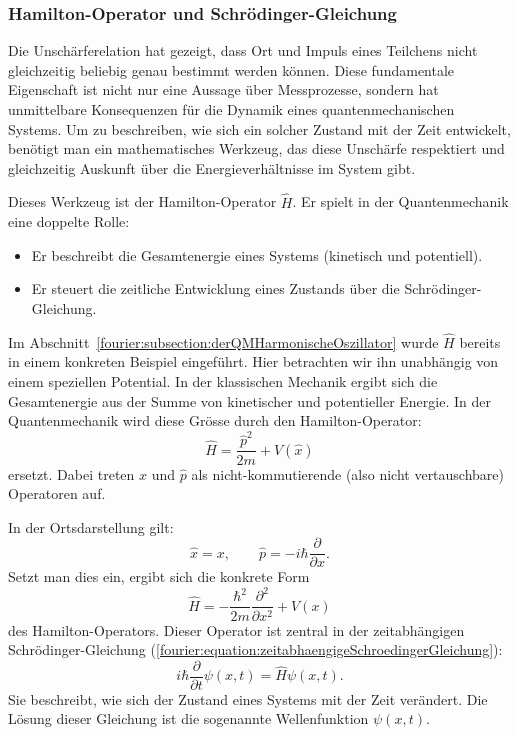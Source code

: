 \subsubsection{Hamilton-Operator und Schrödinger-Gleichung%
\label{fourier:subsubsection:hamiltonOperatorUndSchroedinger}}
Die Unschärferelation hat gezeigt, dass Ort und Impuls eines Teilchens nicht gleichzeitig beliebig genau bestimmt werden können.
Diese fundamentale Eigenschaft ist nicht nur eine Aussage über Messprozesse,
sondern hat unmittelbare Konsequenzen für die Dynamik eines quantenmechanischen Systems.
Um zu beschreiben, wie sich ein solcher Zustand mit der Zeit entwickelt,
benötigt man ein mathematisches Werkzeug, das diese Unschärfe respektiert
und gleichzeitig Auskunft über die Energieverhältnisse im System gibt.

Dieses Werkzeug ist der Hamilton-Operator \( \hat{H} \).
Er spielt in der Quantenmechanik eine doppelte Rolle:
\begin{itemize}
\item Er beschreibt die Gesamtenergie eines Systems (kinetisch und potentiell).
\item Er steuert die zeitliche Entwicklung eines Zustands über die Schrödinger-Gleichung.
\end{itemize}
Im Abschnitt~\ref{fourier:subsection:derQMHarmonischeOszillator} wurde $\hat{H}$ bereits in einem konkreten Beispiel eingeführt.
Hier betrachten wir ihn unabhängig von einem speziellen Potential.
In der klassischen Mechanik ergibt sich die Gesamtenergie aus der Summe von kinetischer und potentieller Energie.
In der Quantenmechanik wird diese Grösse durch den Hamilton-Operator:
\begin{equation}\label{fourier:equation:HamiltonOperatorQM}
	\hat{H} = \frac{\hat{p}^2}{2m} + V(\hat{x})
\end{equation}
ersetzt.
Dabei treten $\hat{x}$ und $\hat{p}$ als nicht-kommutierende (also nicht vertauschbare) Operatoren auf.

In der Ortsdarstellung gilt:
\begin{equation}
	\hat{x} = x, \qquad \hat{p} = -i\hbar \frac{\partial}{\partial x}.
\end{equation}
Setzt man dies ein, ergibt sich die konkrete Form
\begin{equation}
	\hat{H} = -\frac{\hbar^2}{2m} \frac{\partial^2}{\partial x^2} + V(x)
\end{equation}
des Hamilton-Operators.
Dieser Operator ist zentral in der zeitabhängigen Schrödinger-Gleichung (\ref{fourier:equation:zeitabhaengigeSchroedingerGleichung}):
\begin{equation}
	i\hbar \frac{\partial}{\partial t} \psi(x,t) = \hat{H} \psi(x,t).
\end{equation}
Sie beschreibt, wie sich der Zustand eines Systems mit der Zeit verändert.
Die Lösung dieser Gleichung ist die sogenannte Wellenfunktion \( \psi(x,t) \).

